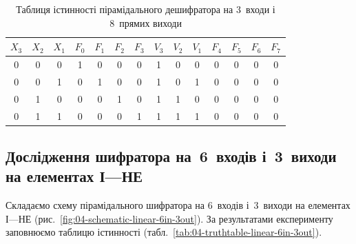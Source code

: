 \documentclass[a4paper,oneside,DIV=12,12pt,headings=normal]{scrartcl}
\begin{document}
			\begin{table}[!htbp]
			\centering
				\begin{tabular}{*{14}{c}}
					\toprule
						$X_3$ & $X_2$ & $X_1$ & $F_0$ & $F_1$ & $F_2$ & $F_3$ & $V_3$ & $V_2$ & $V_1$ & $F_4$ & $F_5$ & $F_6$ & $F_7$ \\
					\midrule
						0 & 0 & 0 & 1 & 0 & 0 & 0 & 1 & 0 & 0 & 0 & 0 & 0 & 0 \\
						0 & 0 & 1 & 0 & 1 & 0 & 0 & 1 & 0 & 1 & 0 & 0 & 0 & 0 \\
						0 & 1 & 0 & 0 & 0 & 1 & 0 & 1 & 1 & 0 & 0 & 0 & 0 & 0 \\
						0 & 1 & 1 & 0 & 0 & 0 & 1 & 1 & 1 & 1 & 0 & 0 & 0 & 0 \\
					\bottomrule
				\end{tabular}
			\caption{Таблиця істинності пірамідального дешифратора на 3~входи і 8~прямих виходи}
			\label{tab:03-truthtable-pyramidal-3in-8out}
			\end{table}
			
		\subsection{Дослідження шифратора на~6~входів і~3~виходи на елементах І—НЕ}
			Складаємо схему пірамідального шифратора на 6~входів і~3~виходи на елементах І—НЕ (рис.~\ref{fig:04-schematic-linear-6in-3out}). За результатами експерименту заповнюємо таблицю істинності (табл.~\ref{tab:04-truthtable-linear-6in-3out}).
			
\end{document}

